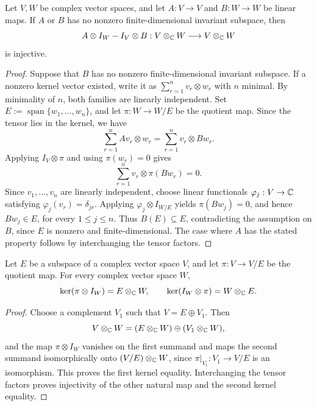 \begin{lemma}\label{lem:tensor-difference-injectivity}
Let $V,W$ be complex vector spaces, and let $A:V\to V$ and $B:W\to W$ be linear maps.
If $A$ or $B$ has no nonzero finite-dimensional invariant subspace, then
\[
 A\otimes I_W-I_V\otimes B:V\otimes_{\mathbb C}W\longrightarrow V\otimes_{\mathbb C}W
\]
is injective.
\end{lemma}
\begin{proof}
Suppose that $B$ has no nonzero finite-dimensional invariant subspace.
If a nonzero kernel vector existed, write it as $\sum_{r=1}^n v_r\otimes w_r$ with $n$ minimal.
By minimality of $n$, both families are linearly independent.
Set $E:=\operatorname{span}\{w_1,\ldots,w_n\}$, and let $\pi:W\to W/E$ be the quotient map.
Since the tensor lies in the kernel, we have
\[
 \sum_{r=1}^n Av_r\otimes w_r=\sum_{r=1}^n v_r\otimes Bw_r.
\]
Applying $I_V\otimes \pi$ and using $\pi(w_r)=0$ gives
\[
 \sum_{r=1}^n v_r\otimes \pi(Bw_r)=0.
\]
Since $v_1,\ldots,v_n$ are linearly independent, choose linear functionals $\varphi_j:V\to\mathbb C$ satisfying $\varphi_j(v_r)=\delta_{jr}$.
Applying $\varphi_j\otimes I_{W/E}$ yields $\pi(Bw_j)=0$, and hence $Bw_j\in E$, for every $1\leq j\leq n$.
Thus $B(E)\subseteq E$, contradicting the assumption on $B$, since $E$ is nonzero and finite-dimensional.
The case where $A$ has the stated property follows by interchanging the tensor factors.
\end{proof}

\begin{lemma}\label{lem:tensor-quotient-kernels}
Let $E$ be a subspace of a complex vector space $V$, and let $\pi:V\to V/E$ be the quotient map.
For every complex vector space $W$,
\[
 \ker(\pi\otimes I_W)=E\otimes_{\mathbb C}W,
 \qquad
 \ker(I_W\otimes\pi)=W\otimes_{\mathbb C}E.
\]
\end{lemma}
\begin{proof}
Choose a complement $V_1$ such that $V=E\oplus V_1$.
Then
\[
 V\otimes_{\mathbb C}W
 =(E\otimes_{\mathbb C}W)\oplus(V_1\otimes_{\mathbb C}W),
\]
and the map $\pi\otimes I_W$ vanishes on the first summand and maps the second summand isomorphically onto $(V/E)\otimes_{\mathbb C}W$, since $\pi|_{V_1}:V_1\to V/E$ is an isomorphism.
This proves the first kernel equality.
Interchanging the tensor factors proves injectivity of the other natural map and the second kernel equality.
\end{proof}

